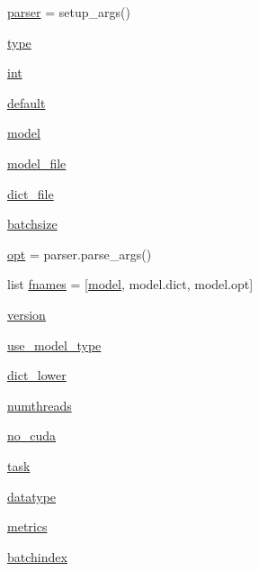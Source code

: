 \begin{DoxyCompactItemize}
\item 
\hyperlink{namespaceeval__ppl_ac90caa8cd53fac99fa41f5349a41e6d3}{parser} = setup\+\_\+args()
\item 
\hyperlink{namespaceeval__ppl_a6408f49f0c707952a277d838a5912296}{type}
\item 
\hyperlink{namespaceeval__ppl_a4d5b66ad0d8e1b8d7db27f256eda8340}{int}
\item 
\hyperlink{namespaceeval__ppl_a0abc29acfe7ed4a10b551d0120cbcbb0}{default}
\item 
\hyperlink{namespaceeval__ppl_a4d13942cad0e4fdaa614c4f31de6e865}{model}
\item 
\hyperlink{namespaceeval__ppl_a91d80ebbef0aae52bb7aab3428c8b917}{model\+\_\+file}
\item 
\hyperlink{namespaceeval__ppl_ae70a1e5d29d1562380de01b52412a9fa}{dict\+\_\+file}
\item 
\hyperlink{namespaceeval__ppl_ab1b2690c1e87212e89a9b5aaf5266749}{batchsize}
\item 
\hyperlink{namespaceeval__ppl_ad8220e41552c5d1888d4005bb713e489}{opt} = parser.\+parse\+\_\+args()
\item 
list \hyperlink{namespaceeval__ppl_a21d7ad87820a8ba4905fffcc224a3395}{fnames} = \mbox{[}\textquotesingle{}\hyperlink{namespaceeval__ppl_a4d13942cad0e4fdaa614c4f31de6e865}{model}\textquotesingle{}, \textquotesingle{}model.\+dict\textquotesingle{}, \textquotesingle{}model.\+opt\textquotesingle{}\mbox{]}
\item 
\hyperlink{namespaceeval__ppl_a62dd1a0428eac48ca86fd9c3c97d12e2}{version}
\item 
\hyperlink{namespaceeval__ppl_a999a1365c520a22de49fc43a7003e7e6}{use\+\_\+model\+\_\+type}
\item 
\hyperlink{namespaceeval__ppl_a3c7de5b6434cc85b28eafa791111e6ae}{dict\+\_\+lower}
\item 
\hyperlink{namespaceeval__ppl_ae04f7bc4679953c457925e380d033458}{numthreads}
\item 
\hyperlink{namespaceeval__ppl_a29e51b395613b8f34d6f3309999cbd17}{no\+\_\+cuda}
\item 
\hyperlink{namespaceeval__ppl_acbb544905bfe31d80f56f1cdce37a02e}{task}
\item 
\hyperlink{namespaceeval__ppl_ab82ad1a3b8b651e5d987534abf365115}{datatype}
\item 
\hyperlink{namespaceeval__ppl_a30f7696b55125e4e64f1d3e97f6abc15}{metrics}
\item 
\hyperlink{namespaceeval__ppl_a69b3068dd1d0768ed8084ff070efb692}{batchindex}
\end{DoxyCompactItemize}


